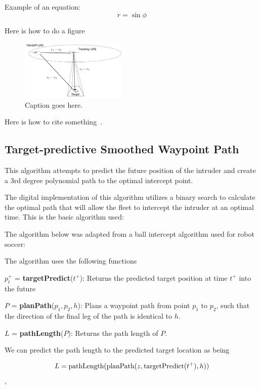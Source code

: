 \documentclass[letterpaper, 10 pt, conference]{ieeeconf}  %
\begin{document}
Example of an equation:
\[
\dot{r} = \sin\phi
\]

Here is how to do a figure
\begin{figure}[hbt]
  \centering
  \includegraphics[width=0.45\textwidth]{figures/scenario}
  \caption{Caption goes here.}
  \label{fig:label}
\end{figure}

Here is how to cite something~\cite{Siouris04}.

\subsection{Target-predictive Smoothed Waypoint Path}
This algorithm attempts to predict the future position of the intruder and create a 3rd degree polynomial path to the optimal intercept point. 

The digital implementation of this algorithm utilizes a binary search to calculate the optimal path that will allow the fleet to intercept the intruder at an optimal time. This is the basic algorithm used:

The algorithm below was adapted from a ball intercept algorithm used for robot soccer:
\newline

The algorithm uses the following functions
\newline

$p_t^+$ = \textbf{targetPredict}($t^+$): Returns the predicted target position at time $t^+$ into the future

$P$ = \textbf{planPath}($p_1, p_2, h$): Plans a waypoint path from point $p_1$ to $p_2$, such that the direction of the final leg of the path is identical to $h$. 

$L$ = \textbf{pathLength}($P$): Returns the path length of $P$.
\newline

We can predict the path length to the predicted target location as being

\[
L = \textnormal{pathLength}(\textnormal{planPath}(z, \textnormal{targetPredict}(t^+),h))
\],
\end{document}
